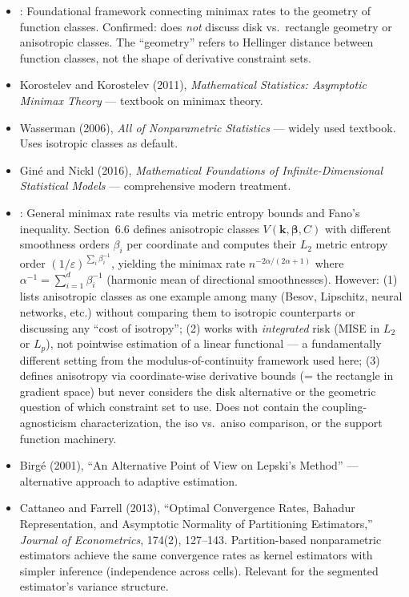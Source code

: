 \begin{itemize}
	\item \textcite{donoho_geometrizing_1991}: Foundational framework connecting minimax rates to the geometry of function classes. Confirmed: does \emph{not} discuss disk vs.\ rectangle geometry or anisotropic classes. The ``geometry'' refers to Hellinger distance between function classes, not the shape of derivative constraint sets.
	\item Korostelev and Korostelev (2011), \emph{Mathematical Statistics: Asymptotic Minimax Theory} --- textbook on minimax theory. 
	\item Wasserman (2006), \emph{All of Nonparametric Statistics} --- widely used textbook. Uses isotropic classes as default. 
	\item Giné and Nickl (2016), \emph{Mathematical Foundations of Infinite-Dimensional Statistical Models} --- comprehensive modern treatment. 
	\item \textcite{yang_information-theoretic_1999}: General minimax rate results via metric entropy bounds and Fano's inequality.
	Section~6.6 defines anisotropic classes $V(\mathbf{k}, \boldsymbol{\beta}, C)$ with different smoothness orders $\beta_i$ per coordinate and computes their $L_2$ metric entropy order $(1/\varepsilon)^{\sum_i \beta_i^{-1}}$, yielding the minimax rate $n^{-2\alpha/(2\alpha+1)}$ where $\alpha^{-1} = \sum_{i=1}^d \beta_i^{-1}$ (harmonic mean of directional smoothnesses).
	However: (1) lists anisotropic classes as one example among many (Besov, Lipschitz, neural networks, etc.) without comparing them to isotropic counterparts or discussing any ``cost of isotropy'';
	(2) works with \emph{integrated} risk (MISE in $L_2$ or $L_p$), not pointwise estimation of a linear functional --- a fundamentally different setting from the modulus-of-continuity framework used here;
	(3) defines anisotropy via coordinate-wise derivative bounds (= the rectangle in gradient space) but never considers the disk alternative or the geometric question of which constraint set to use.
	Does not contain the coupling-agnosticism characterization, the iso vs.\ aniso comparison, or the support function machinery.
	\item Birgé (2001), ``An Alternative Point of View on Lepski's Method'' --- alternative approach to adaptive estimation. 
	\item Cattaneo and Farrell (2013), ``Optimal Convergence Rates, Bahadur Representation, and Asymptotic Normality of Partitioning Estimators,'' \emph{Journal of Econometrics}, 174(2), 127--143. Partition-based nonparametric estimators achieve the same convergence rates as kernel estimators with simpler inference (independence across cells). Relevant for the segmented estimator's variance structure.
\end{itemize}


